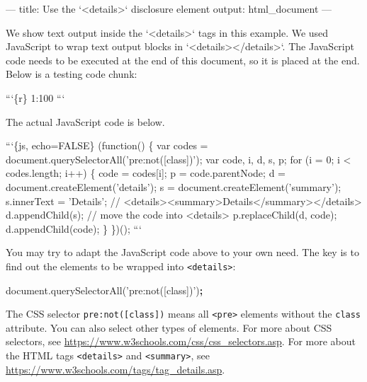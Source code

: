 \documentclass[
  11pt,
]{krantz}
\newenvironment{Shaded}{\begin{snugshade}}{\end{snugshade}}
\newcommand{\AttributeTok}[1]{\textcolor[rgb]{0.61,0.61,0.61}{#1}}
\newcommand{\BaseNTok}[1]{\textcolor[rgb]{0.06,0.06,0.06}{#1}}
\newcommand{\NormalTok}[1]{#1}
\newcommand{\OperatorTok}[1]{\textcolor[rgb]{0.43,0.43,0.43}{\textbf{#1}}}
\newcommand{\StringTok}[1]{\textcolor[rgb]{0.5,0.5,0.5}{#1}}
\newcommand{\VariableTok}[1]{\textcolor[rgb]{0,0,0}{#1}}
\begin{document}
\begin{Shaded}
\begin{Highlighting}[]
\NormalTok{---}
\NormalTok{title: Use the }\BaseNTok{`<details>`}\NormalTok{ disclosure element}
\NormalTok{output: html_document}
\NormalTok{---}

\NormalTok{We show text output inside the }\BaseNTok{`<details>`}\NormalTok{ tags in this}
\NormalTok{example. We used JavaScript to wrap text output blocks}
\NormalTok{in }\BaseNTok{`<details></details>`}\NormalTok{. The JavaScript code needs to}
\NormalTok{be executed at the end of this document, so it is placed}
\NormalTok{at the end. Below is a testing code chunk:}

\BaseNTok{```\{r\}}
\BaseNTok{1:100}
\BaseNTok{```}

\NormalTok{The actual JavaScript code is below.}

\BaseNTok{```\{js, echo=FALSE\}}
\BaseNTok{(function() \{}
\BaseNTok{  var codes = document.querySelectorAll('pre:not([class])');}
\BaseNTok{  var code, i, d, s, p;}
\BaseNTok{  for (i = 0; i < codes.length; i++) \{}
\BaseNTok{    code = codes[i];}
\BaseNTok{    p = code.parentNode;}
\BaseNTok{    d = document.createElement('details');}
\BaseNTok{    s = document.createElement('summary');}
\BaseNTok{    s.innerText = 'Details';}
\BaseNTok{    // <details><summary>Details</summary></details>}
\BaseNTok{    d.appendChild(s);}
\BaseNTok{    // move the code into <details>}
\BaseNTok{    p.replaceChild(d, code);}
\BaseNTok{    d.appendChild(code);}
\BaseNTok{  \}}
\BaseNTok{\})();}
\BaseNTok{```}
\end{Highlighting}
\end{Shaded}

You may try to adapt the JavaScript code above to your own need. The key is to find out the elements to be wrapped into \texttt{\textless{}details\textgreater{}}:

\begin{Shaded}
\begin{Highlighting}[]
\VariableTok{document}\NormalTok{.}\AttributeTok{querySelectorAll}\NormalTok{(}\StringTok{'pre:not([class])'}\NormalTok{)}\OperatorTok{;}
\end{Highlighting}
\end{Shaded}

The CSS selector \texttt{pre:not({[}class{]})} means all \texttt{\textless{}pre\textgreater{}} elements without the \texttt{class} attribute. You can also select other types of elements. For more about CSS selectors, see \url{https://www.w3schools.com/css/css_selectors.asp}. For more about the HTML tags \texttt{\textless{}details\textgreater{}} and \texttt{\textless{}summary\textgreater{}}, see \url{https://www.w3schools.com/tags/tag_details.asp}.
\end{document}
